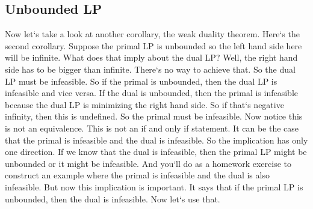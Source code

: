 \subsection{Unbounded LP}
Now let`s take a look at another corollary, the weak duality theorem.
Here`s the second corollary.
Suppose the primal LP is unbounded so the left hand side here will be infinite.
What does that imply about the dual LP? Well, the right hand side has to be bigger than infinite.
There`s no way to achieve that.
So the dual LP must be infeasible.
So if the primal is unbounded, then the dual LP is infeasible and vice versa.
If the dual is unbounded, then the primal is infeasible because the dual LP is minimizing the right hand side.
So if that`s negative infinity, then this is undefined.
So the primal must be infeasible.
Now notice this is not an equivalence.
This is not an if and only if statement.
It can be the case that the primal is infeasible and the dual is infeasible.
So the implication has only one direction.
If we know that the dual is infeasible, then the primal LP might be unbounded or it might be infeasible.
And you`ll do as a homework exercise to construct an example where the primal is infeasible and the dual is also infeasible.
But now this implication is important.
It says that if the primal LP is unbounded, then the dual is infeasible.
Now let`s use that.

